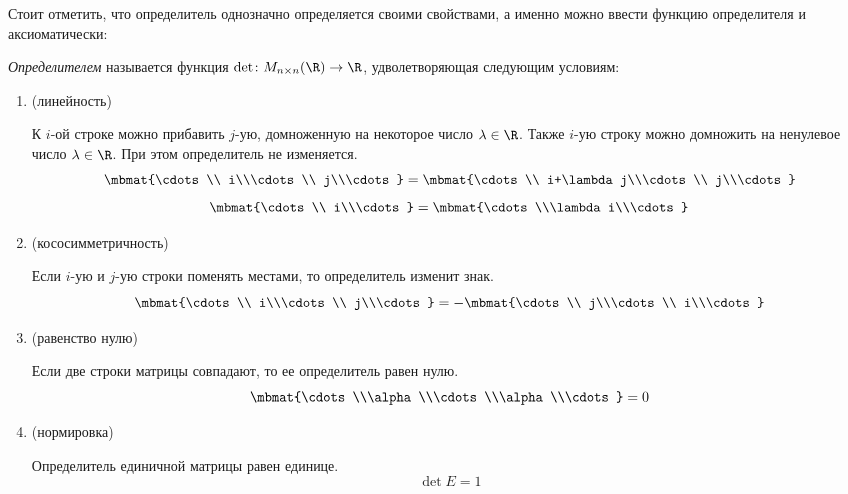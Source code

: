 Стоит отметить, что определитель однозначно определяется своими свойствами, а именно можно ввести функцию определителя и аксиоматически:

\emph{Определителем} называется функция $\det\colon M_{n\times n}(\R)\to\R$, удволетворяющая следующим условиям:

\begin{enumerate}
	\item(линейность)\par
		К $i$-ой строке можно прибавить $j$-ую, домноженную на некоторое число
		$\lambda\in\R$. Также $i$-ую строку можно домножить на ненулевое число
		$\lambda\in\R$. При этом определитель не изменяется.
		$$
			\mbmat{\cdots\\ i\\\cdots\\ j\\\cdots}=
			\mbmat{\cdots\\ i+\lambda j\\\cdots\\ j\\\cdots}
		$$ $$
			\mbmat{\cdots\\ i\\\cdots}=
			\mbmat{\cdots\\\lambda i\\\cdots}
		$$
	\item(кососимметричность)\par
		Если $i$-ую и $j$-ую строки поменять местами, то определитель изменит знак.
		$$
			\mbmat{\cdots\\ i\\\cdots\\ j\\\cdots}=-
			\mbmat{\cdots\\ j\\\cdots\\ i\\\cdots}
		$$
	\item(равенство нулю)\par
		Если две строки матрицы совпадают, то ее определитель равен нулю.
		$$
			\mbmat{\cdots\\\alpha\\\cdots\\\alpha\\\cdots}=0
		$$
	\item(нормировка)\par
		Определитель единичной матрицы равен единице.
		$$ \det E=1 $$
\end{enumerate}

